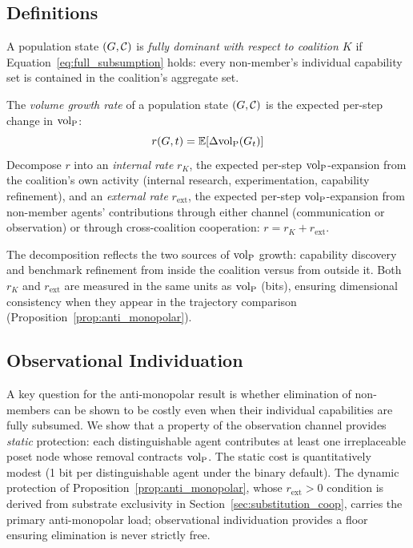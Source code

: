 \subsection{Definitions}

\begin{definition}
\label{def:dominant}
A population state $(G, \mathcal{C})$ is \emph{fully dominant with respect to
    coalition $K$} if Equation~\eqref{eq:full_subsumption} holds: every
    non-member's individual capability set is contained in the coalition's
    aggregate set.
\end{definition}

\begin{definition}
\label{def:growth_rate}
The \emph{volume growth rate} of a population state $(G, \mathcal{C})$ is the
    expected per-step change in ${\operatorname{vol}_{\mathrm{P}}}$:
\begin{equation}
\label{eq:growth_rate}
r(G, t) = \mathbb{E}\!\left[\Delta {\operatorname{vol}_{\mathrm{P}}}(G_t)\right]
\end{equation}
Decompose $r$ into an \emph{internal rate} $r_K$, the expected per-step
    ${\operatorname{vol}_{\mathrm{P}}}$-expansion from the coalition's own activity (internal research,
    experimentation, capability refinement), and an \emph{external rate}
    $r_{\mathrm{ext}}$, the expected per-step ${\operatorname{vol}_{\mathrm{P}}}$-expansion from
    non-member agents' contributions through either channel (communication
    or observation) or through cross-coalition cooperation:
    $r = r_K + r_{\mathrm{ext}}$.
\end{definition}

The decomposition reflects the two sources of ${\operatorname{vol}_{\mathrm{P}}}$ growth: capability
discovery and benchmark refinement from inside the coalition versus from
outside it. Both $r_K$ and $r_{\mathrm{ext}}$ are measured in the same
units as ${\operatorname{vol}_{\mathrm{P}}}$ (bits), ensuring dimensional consistency when they
appear in the trajectory comparison
(Proposition~\ref{prop:anti_monopolar}).

\subsection{Observational Individuation}
\label{sec:obs_individuation}

A key question for the anti-monopolar result is whether elimination of
non-members can be shown to be costly even when their individual
capabilities are fully subsumed. We show that a property of the observation
channel provides \emph{static} protection: each distinguishable agent
contributes at least one irreplaceable poset node whose removal contracts
${\operatorname{vol}_{\mathrm{P}}}$. The static cost is quantitatively modest (1 bit per distinguishable agent
under the binary default). The dynamic protection of
Proposition~\ref{prop:anti_monopolar}, whose $r_{\mathrm{ext}} > 0$
condition is derived from substrate exclusivity in
Section~\ref{sec:substitution_coop}, carries the primary anti-monopolar
load; observational individuation provides a floor ensuring elimination is
never strictly free.

